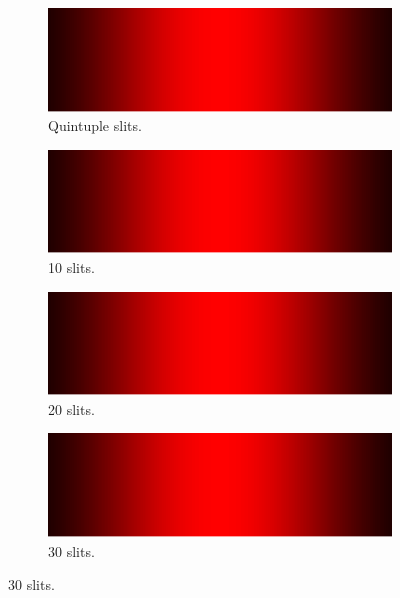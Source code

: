 \documentclass[oneside]{book}
\begin{document}
\begin{figure}[htbp]
    \centering
    \ContinuedFloat %
    \begin{subfigure}[c]{\textwidth}
        \centering
        \includegraphics[width=\textwidth,page=5]{../images/pgf-interference/interference.pdf}
        \caption{Quintuple slits.}
    \end{subfigure}%

    \begin{subfigure}[c]{\textwidth}
        \centering
        \includegraphics[width=\textwidth,page=6]{../images/pgf-interference/interference.pdf}
        \caption{10 slits.}
    \end{subfigure}%

    \begin{subfigure}[c]{\textwidth}
        \centering
        \includegraphics[width=\textwidth,page=7]{../images/pgf-interference/interference.pdf}
        \caption{20 slits.}
    \end{subfigure}%

    \begin{subfigure}[c]{\textwidth}
        \centering
        \includegraphics[width=\textwidth,page=8]{../images/pgf-interference/interference.pdf}
        \caption{30 slits.}
    \end{subfigure}%
\end{figure}
\end{document}
